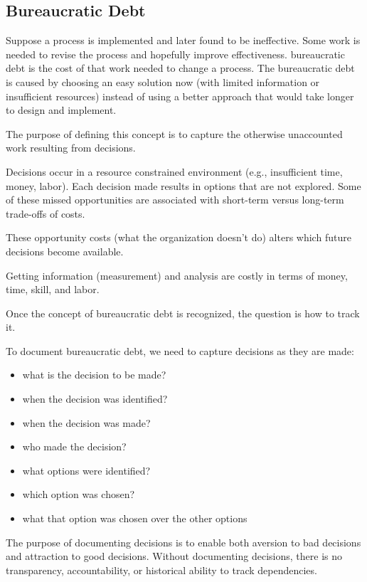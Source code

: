 \subsection{Bureaucratic Debt\label{sec:bureaucratic_debt}}


Suppose a \gls{process} is implemented and later found to be ineffective. Some work is needed to revise the process and hopefully improve effectiveness. \gls{bureaucratic debt} is the cost of that work needed to change a process. The bureaucratic debt is caused by choosing an easy solution now (with limited information or insufficient resources) instead of using a better approach that would take longer to design and implement.

The purpose of defining this concept is to capture the otherwise unaccounted work resulting from decisions.


Decisions occur in a resource constrained environment (e.g., insufficient time, money, labor). Each decision made results in options that are not explored. Some of these missed opportunities are associated with short-term versus long-term trade-offs of costs.

These opportunity costs (what the organization doesn't do) alters which future decisions become available.

Getting information (measurement) and analysis are costly in terms of money, time, skill, and labor.

Once the concept of bureaucratic debt is recognized, the question is how to track it.

To document bureaucratic debt, we need to capture decisions as they are made:
\begin{itemize}
    \item what is the decision to be made?
    \item when the decision was identified?
    \item when the decision was made?
    \item who made the decision?
    \item what options were identified?
    \item which option was chosen?
    \item what that option was chosen over the other options
\end{itemize}
The purpose of documenting decisions is to enable both aversion to bad decisions and attraction to good decisions. Without documenting decisions, there is no transparency, accountability, or historical ability to track dependencies. 

